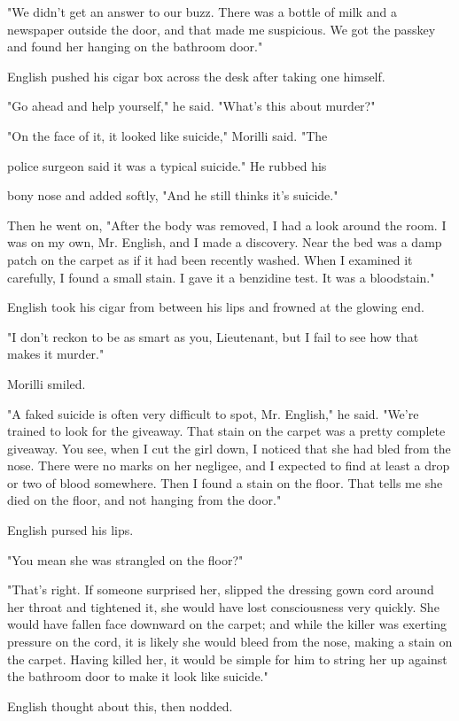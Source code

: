 \documentclass{novel}
\begin{document}
"We didn't get an answer to our buzz. There was a bottle of milk and a newspaper outside the door, and that made me suspicious. We got the passkey and found her hanging on the bathroom door."

English pushed his cigar box across the desk after taking one himself.

"Go ahead and help yourself," he said. "What's this about murder?"

"On the face of it, it looked like suicide," Morilli said. "The

police surgeon said it was a typical suicide." He rubbed his

bony nose and added softly, "And he still thinks it's suicide."

Then he went on, "After the body was removed, I had a look around the room. I was on my own, Mr. English, and I made a discovery. Near the bed was a damp patch on the carpet as if it had been recently washed. When I examined it carefully, I found a small stain. I gave it a benzidine test. It was a bloodstain."

English took his cigar from between his lips and frowned at the glowing end.

"I don't reckon to be as smart as you, Lieutenant, but I fail to see how that makes it murder."

Morilli smiled.

"A faked suicide is often very difficult to spot, Mr. English," he said. "We're trained to look for the giveaway. That stain on the carpet was a pretty complete giveaway. You see, when I cut the girl down, I noticed that she had bled from the nose. There were no marks on her negligee, and I expected to find at least a drop or two of blood somewhere. Then I found a stain on the floor. That tells me she died on the floor, and not hanging from the door."

English pursed his lips.

"You mean she was strangled on the floor?"

"That's right. If someone surprised her, slipped the dressing gown cord around her throat and tightened it, she would have lost consciousness very quickly. She would have fallen face downward on the carpet; and while the killer was exerting pressure on the cord, it is likely she would bleed from the nose, making a stain on the carpet. Having killed her, it would be simple for him to string her up against the bathroom door to make it look like suicide."

English thought about this, then nodded.
\end{document}
